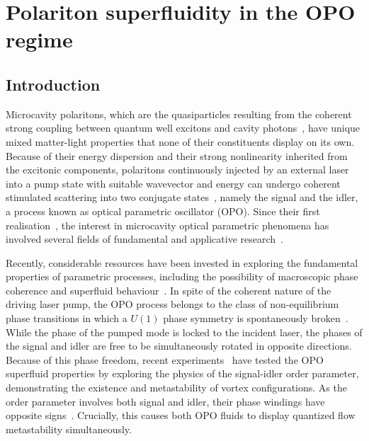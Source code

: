 

\chapter{Polariton superfluidity in the OPO regime}
\label{cha:opo}




\section{Introduction}
%
Microcavity polaritons, which are the quasiparticles resulting from
the coherent strong coupling between quantum well excitons and cavity
photons~\cite{9780199228942}, have unique mixed matter-light
properties that none of their constituents display on its own. Because
of their energy dispersion and their strong nonlinearity inherited
from the excitonic components, polaritons continuously injected by an
external laser into a pump state with suitable wavevector and energy
can undergo coherent stimulated scattering into two conjugate
states~\cite{Ciuti_2000,Ciuti_2001,Ciuti_2003}, namely the signal and
the idler, a process known as optical parametric oscillator (OPO).
%
Since their first
realisation~\cite{Stevenson_2000,Savvidis_2000,Savvidis_2000_b,Baumberg_2000,Saba_2001},
the interest in microcavity optical parametric phenomena has involved
several fields of fundamental and applicative
research~\cite{Edamatsu_2004,Savasta_2005,Lanco_2006,Abbarchi_2011,Ardizzone_2012,Xie_2012,Lecomte_2013}.

Recently, considerable resources have been invested in exploring the
fundamental properties of parametric processes, including the
possibility of macroscopic phase coherence and superfluid
behaviour~\cite{Carusotto_2013}.
%
In spite of the coherent nature of the driving laser pump, the OPO
process belongs to the class of non-equilibrium phase transitions in
which a $U(1)$ phase symmetry is spontaneously
broken~\cite{Wouters_2007}.
%
While the phase of the pumped mode is locked to the incident laser,
the phases of the signal and idler are free to be simultaneously rotated in
opposite directions.
%
Because of this phase freedom, recent experiments~\cite{Sanvitto_2010}
have tested the OPO superfluid properties by exploring the physics of
the signal-idler order parameter, demonstrating the existence and
metastability of vortex configurations. As the order parameter
involves both signal and idler, their phase windings have opposite
signs~\cite{Sanvitto_2010,Marchetti_2010,9783642241857}.  Crucially, this
causes both OPO fluids to display quantized flow metastability
simultaneously.

